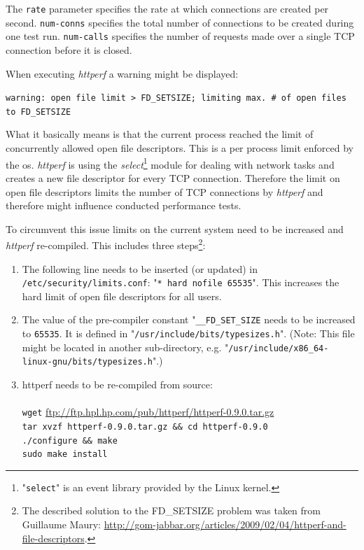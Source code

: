 The \texttt{rate} parameter specifies the rate at which connections are created per second. \texttt{num-conns} specifies the total number of connections to be created during one test run. \texttt{num-calls} specifies the number of requests made over a single TCP connection before it is closed.

When executing \textit{httperf} a warning might be displayed:

\texttt{warning: open file limit > FD\_SETSIZE; limiting max. \# of open files to FD\_SETSIZE}

What it basically means is that the current process reached the limit of concurrently allowed open file descriptors. This is a per process limit enforced by the \gls{os}. \textit{httperf} is using the \textit{select}\footnote{"\texttt{select}" is an event library provided by the Linux kernel.} module for dealing with network tasks and creates a new file descriptor for every TCP connection. Therefore the limit on open file descriptors limits the number of TCP connections by \textit{httperf} and therefore might influence conducted performance tests.

To circumvent this issue limits on the current system need to be increased and \textit{httperf} re-compiled. This includes three steps\footnote{The described solution to the FD\_SETSIZE problem was taken from Guillaume Maury: \url{http://gom-jabbar.org/articles/2009/02/04/httperf-and-file-descriptors}.}:

\begin{enumerate}
\item The following line needs to be inserted (or updated) in \texttt{/etc/security/limits.conf}: "\texttt{* hard nofile 65535}". This increases the hard limit of open file descriptors for all users.

\item The value of the pre-compiler constant "\texttt{\_\_FD\_SET\_SIZE} needs to be increased to \texttt{65535}. It is defined in "\texttt{/usr/include/bits/typesizes.h}". (Note: This file might be located in another sub-directory, e.g. "\texttt{/usr/include/x86\_64-linux-gnu/bits/typesizes.h}".)

\item httperf needs to be re-compiled from source:\\
 \\
\texttt{wget} \url{ftp://ftp.hpl.hp.com/pub/httperf/httperf-0.9.0.tar.gz}\\
\texttt{tar xvzf httperf-0.9.0.tar.gz \&\& cd httperf-0.9.0\\
./configure \&\& make\\
sudo make install}
\end{enumerate}

